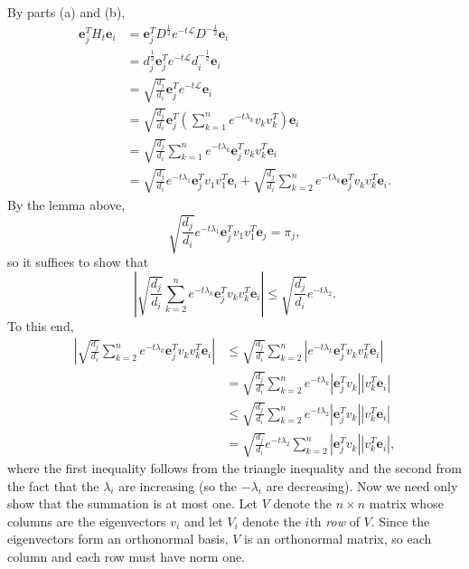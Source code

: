 \documentclass{article}
\newcommand{\1}{\mathbf{1}}
\newcommand{\0}{\mathbf{0}}
\newcommand{\e}{\mathbf{e}}
\renewcommand{\L}{\mathcal{L}}
\begin{document}
\begin{enumerate}
\begin{enumerate}
    By parts (a) and (b),
    \begin{align*}
      \e_j^T H_t \e_i &= \e_j^T D^{\frac{1}{2}} e^{-t \L} D^{-\frac{1}{2}} \e_i \\
      & = d_j^{\frac{1}{2}} \e_j^T e^{-t \L} d_i^{-\frac{1}{2}} \e_i \\
      & = \sqrt{\frac{d_j}{d_i}} \e_j^T e^{-t \L} \e_i \\
      & = \sqrt{\frac{d_j}{d_i}} \e_j^T (\sum_{k = 1}^n e^{-t \lambda_k} v_k v_k^T) \e_i \\
      & = \sqrt{\frac{d_j}{d_i}} \sum_{k = 1}^n e^{-t \lambda_k} \e_j^T v_k v_k^T \e_i \\
       & = \sqrt{\frac{d_j}{d_i}} e^{-t \lambda_1} \e_j^T v_1 v_1^T \e_i + \sqrt{\frac{d_j}{d_i}} \sum_{k = 2}^n e^{-t \lambda_k} \e_j^T v_k v_k^T \e_i.
    \end{align*}
    By the lemma above,
    \begin{equation*}
      \sqrt{\frac{d_j}{d_i}} e^{-t \lambda_1} \e_j^T v_1 v_1^T \e_j = \pi_j,
    \end{equation*}
    so it suffices to show that
    \begin{equation*}
      \left|\sqrt{\frac{d_j}{d_i}} \sum_{k = 2}^n e^{-t \lambda_k} \e_j^T v_k v_k^T \e_i\right| \leq \sqrt{\frac{d_j}{d_i}} e^{-t \lambda_2}.
    \end{equation*}
    To this end,
    \begin{align*}
      \left|\sqrt{\frac{d_j}{d_i}} \sum_{k = 2}^n e^{-t \lambda_k} \e_j^T v_k v_k^T \e_i\right| & \leq \sqrt{\frac{d_j}{d_i}} \sum_{k = 2}^n \left|e^{-t \lambda_k} \e_j^T v_k v_k^T \e_i\right| \\
      & = \sqrt{\frac{d_j}{d_i}} \sum_{k = 2}^n e^{-t \lambda_k} \left|\e_j^T v_k\right| \left|v_k^T \e_i\right| \\
      & \leq \sqrt{\frac{d_j}{d_i}} \sum_{k = 2}^n e^{-t \lambda_2} \left|\e_j^T v_k\right| \left|v_k^T \e_i\right| \\
      & = \sqrt{\frac{d_j}{d_i}} e^{-t \lambda_2} \sum_{k = 2}^n \left|\e_j^T v_k\right| \left|v_k^T \e_i\right|,
    \end{align*}
    where the first inequality follows from the triangle inequality and the second from the fact that the $\lambda_i$ are increasing (so the $-\lambda_i$ are decreasing).
    Now we need only show that the summation is at most one.
    Let $V$ denote the $n \times n$ matrix whose columns are the eigenvectors $v_i$ and let $V_i$ denote the $i$th \emph{row} of $V$.
    Since the eigenvectors form an orthonormal basis, $V$ is an orthonormal matrix, so each column and each row must have norm one.

\end{enumerate}
\end{enumerate}
\end{document}
